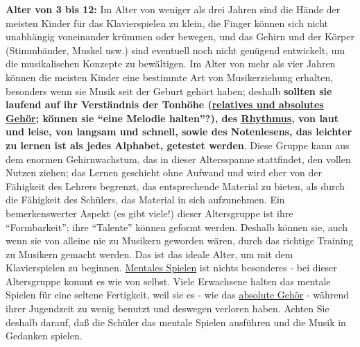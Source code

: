 \textbf{Alter von 3 bis 12:} Im Alter von weniger als drei Jahren sind die Hände der meisten Kinder für das Klavierspielen zu klein, die Finger können sich nicht unabhängig voneinander krümmen oder bewegen, und das Gehirn und der Körper (Stimmbänder, Muskel usw.) sind eventuell noch nicht genügend entwickelt, um die musikalischen Konzepte zu bewältigen.
Im Alter von mehr als vier Jahren können die meisten Kinder eine bestimmte Art von Musikerziehung erhalten, besonders wenn sie Musik seit der Geburt gehört haben; deshalb \textbf{sollten sie laufend auf ihr Verständnis der Tonhöhe (\hyperref[c1iii12]{relatives und absolutes Gehör}; können sie \enquote{eine Melodie halten}?), des \hyperref[c1iii1b]{Rhythmus}, von laut und leise, von langsam  und schnell, sowie des Notenlesens, das leichter zu lernen ist als jedes Alphabet, getestet werden}.
Diese Gruppe kann aus dem enormen Gehirnwachstum, das in dieser Altersspanne stattfindet, den vollen Nutzen ziehen;
das Lernen geschieht ohne Aufwand und wird eher von der Fähigkeit des Lehrers begrenzt, das entsprechende Material zu bieten, als durch die Fähigkeit des Schülers, das Material in sich aufzunehmen.
Ein bemerkenswerter Aspekt (es gibt viele!) dieser Altersgruppe ist ihre \enquote{Formbarkeit}; ihre \enquote{Talente} können geformt werden.
Deshalb können sie, auch wenn sie von alleine nie zu Musikern geworden wären, durch das richtige Training zu Musikern gemacht werden.
Das ist das ideale Alter, um mit dem Klavierspielen zu beginnen.
\hyperref[c1ii12mental]{Mentales Spielen} ist nichts besonderes - bei dieser Altersgruppe kommt es wie von selbst.
Viele Erwachsene halten das mentale Spielen für eine seltene Fertigkeit, weil sie es - wie das \hyperref[c1iii12]{absolute Gehör} - während ihrer Jugendzeit zu wenig benutzt und deswegen verloren haben.
Achten Sie deshalb darauf, daß die Schüler das mentale Spielen ausführen und die Musik in Gedanken spielen.


\label{c1iii18c13}


